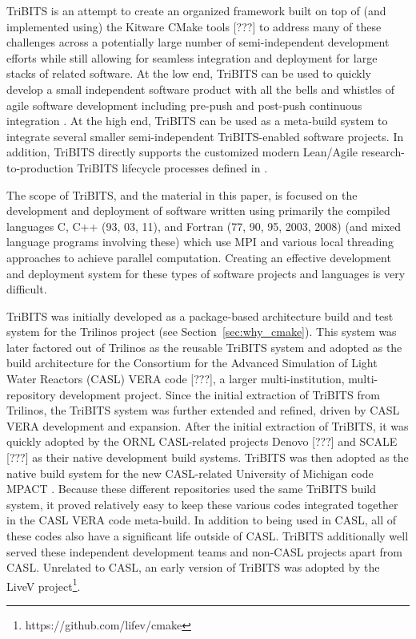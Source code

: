 \documentclass[note]{TechNote}
\begin{document}
TriBITS is an attempt to create an organized framework built on top of (and implemented using) the Kitware CMake tools [???] to address many of these challenges across a potentially large number of semi-independent development efforts while still allowing for seamless integration and deployment for large stacks of related software.  At the low end, TriBITS can be used to quickly develop a small independent software product with all the bells and whistles of agile software development including pre-push and post-push continuous integration \cite{XP2, ContinuousIntegration07}.  At the high end, TriBITS can be used as a meta-build system to integrate several smaller semi-independent TriBITS-enabled software projects.  In addition, TriBITS directly supports the customized modern Lean/Agile research-to-production TriBITS lifecycle processes defined in \cite{TribitsLifecycleModel, TribitsLifecycleModel_eScience2012}.

The scope of TriBITS, and the material in this paper, is focused on the development and deployment of software written using primarily the compiled languages C, C++ (93, 03, 11), and Fortran (77, 90, 95, 2003, 2008) (and mixed language programs involving these) which use MPI and various local threading approaches to achieve parallel computation.  Creating an effective development and deployment system for these types of software projects and languages is very difficult.

TriBITS was initially developed as a package-based architecture build and test system for the Trilinos project (see Section~\ref{sec:why_cmake}).  This system was later factored out of Trilinos as the reusable TriBITS system and adopted as the build architecture for the Consortium for the Advanced Simulation of Light Water Reactors (CASL) VERA code [???], a larger multi-institution, multi-repository development project.  Since the initial extraction of TriBITS from Trilinos, the TriBITS system was further extended and refined, driven by CASL VERA development and expansion.   After the initial extraction of TriBITS, it was quickly adopted by the ORNL CASL-related projects Denovo [???] and SCALE [???] as their native development build systems.  TriBITS was then adopted as the native build system for the new CASL-related University of Michigan code MPACT \cite{MPACT}.  Because these different repositories used the same TriBITS build system, it proved relatively easy to keep these various codes integrated together in the CASL VERA code meta-build.  In addition to being used in CASL, all of these codes also have a significant life outside of CASL.  TriBITS additionally well served these independent development teams and non-CASL projects apart from CASL.  Unrelated to CASL, an early version of TriBITS was adopted by the LiveV project\footnote{https://github.com/lifev/cmake}.
\end{document}
